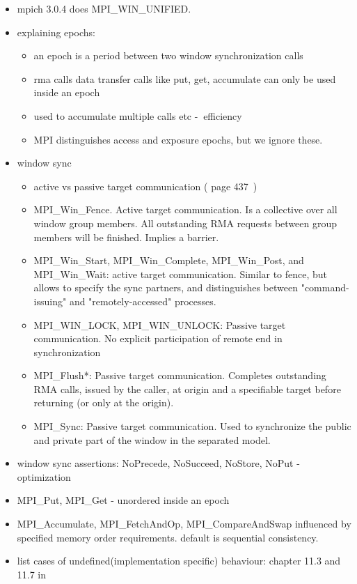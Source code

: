 \documentclass[a4paper, 10pt]{article}
\begin{document}
\begin{itemize}
\begin{itemize}
			\item mpich 3.0.4 does MPI\_WIN\_UNIFIED.
			\item explaining epochs:
				\begin{itemize}
					\item an epoch is a period between two window synchronization calls
					\item rma calls data transfer calls like put, get, accumulate can only be used inside an epoch
					\item used to accumulate multiple calls etc -$\>$ efficiency
					\item MPI distinguishes access and exposure epochs, but we ignore these.
				\end{itemize}
			\item window sync
				\begin{itemize}
					\item active vs passive target communication (\cite{mpi3} page 437~)
					\item MPI\_Win\_Fence. Active target communication. Is a collective over all window group members. All outstanding RMA requests between group members will be finished. Implies a barrier.
					\item MPI\_Win\_Start, MPI\_Win\_Complete, MPI\_Win\_Post, and MPI\_Win\_Wait: active target communication. Similar to fence, but allows to specify the sync partners, and distinguishes between "command-issuing" and "remotely-accessed" processes.
					\item MPI\_WIN\_LOCK, MPI\_WIN\_UNLOCK: Passive target communication. No explicit participation of remote end in synchronization
					\item MPI\_Flush*: Passive target communication. Completes outstanding RMA calls, issued by the caller, at origin and a specifiable target before returning (or only at the origin).
					\item MPI\_Sync: Passive target communication. Used to synchronize the public and private part of the window in the separated model.
				\end{itemize}
			\item window sync assertions: NoPrecede, NoSucceed, NoStore, NoPut -$\>$ optimization
			\item MPI\_Put, MPI\_Get - unordered inside an epoch
			\item MPI\_Accumulate, MPI\_FetchAndOp, MPI\_CompareAndSwap influenced by specified memory order requirements. default is sequential consistency.
			\item list cases of undefined(implementation specific) behaviour: chapter 11.3 and 11.7 in \cite{mpi3}

\end{itemize}
\end{itemize}
\end{document}
